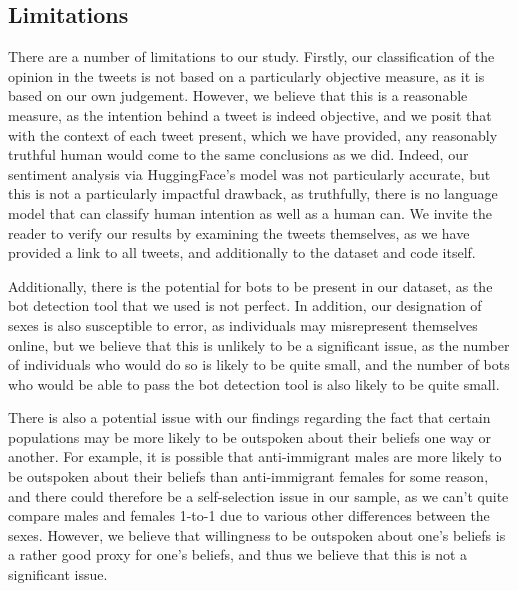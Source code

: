 \documentclass{article}
\begin{document}
\subsection{Limitations}



There are a number of limitations to our study. Firstly, our classification of the opinion in the tweets is not based on a particularly objective measure, as it is based on our own judgement. However, we believe that this is a reasonable measure, as the intention behind a tweet is indeed objective, and we posit that with the context of each tweet present, which we have provided, any reasonably truthful human would come to the same conclusions as we did. Indeed, our sentiment analysis via HuggingFace's model was not particularly accurate, but this is not a particularly impactful drawback, as truthfully, there is no language model that can classify human intention as well as a human can. We invite the reader to verify our results by examining the tweets themselves, as we have provided a link to all tweets, and additionally to the dataset and code itself.

Additionally, there is the potential for bots to be present in our dataset, as the bot detection tool that we used is not perfect. In addition, our designation of sexes is also susceptible to error, as individuals may misrepresent themselves online, but we believe that this is unlikely to be a significant issue, as the number of individuals who would do so is likely to be quite small, and the number of bots who would be able to pass the bot detection tool is also likely to be quite small.

There is also a potential issue with our findings regarding the fact that certain populations may be more likely to be outspoken about their beliefs one way or another. For example, it is possible that anti-immigrant males are more likely to be outspoken about their beliefs than anti-immigrant females for some reason, and there could therefore be a self-selection issue in our sample, as we can't quite compare males and females 1-to-1 due to various other differences between the sexes. However, we believe that willingness to be outspoken about one's beliefs is a rather good proxy for one's beliefs, and thus we believe that this is not a significant issue.
\end{document}
